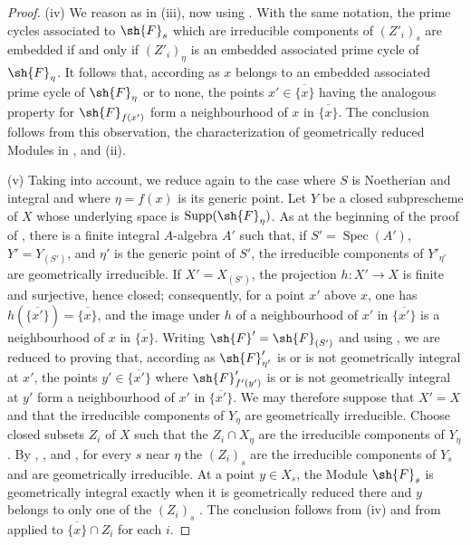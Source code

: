 \begin{proof}
(iv) We reason as in (iii), now using .
With the same notation, the prime cycles associated to $\sh{F}_s$ which are irreducible components of $(Z'_i)_s$ are embedded if and only if $(Z'_i)_\eta$ is an embedded associated prime cycle of $\sh{F}_\eta$.
It follows that, according as $x$ belongs to an embedded associated prime cycle of $\sh{F}_\eta$ or to none, the points $x'\in\overline{\{x\}}$ having the analogous property for $\sh{F}_{f(x')}$ form a neighbourhood of $x$ in $\overline{\{x\}}$.
The conclusion follows from this observation, the characterization of geometrically reduced Modules in , and (ii).

(v) Taking  into account, we reduce again to the case where $S$ is Noetherian and integral and where $\eta=f(x)$ is its generic point.
Let $Y$ be a closed subprescheme of $X$ whose underlying space is $\operatorname{Supp}(\sh{F}_\eta)$.
As at the beginning of the proof of , there is a finite integral $A$-algebra $A'$ such that, if $S'=\operatorname{Spec}(A')$, $Y'=Y_{(S')}$, and $\eta'$ is the generic point of $S'$, the irreducible components of $Y'_{\eta'}$ are geometrically irreducible.
If $X'=X_{(S')}$, the projection $h:X'\to X$ is finite and surjective, hence closed; consequently, for a point $x'$ above $x$, one has $h(\overline{\{x'\}})=\overline{\{x\}}$, and the image under $h$ of a neighbourhood of $x'$ in $\overline{\{x'\}}$ is a neighbourhood of $x$ in $\overline{\{x\}}$.
Writing $\sh{F}'=\sh{F}_{(S')}$ and using , we are reduced to proving that, according as $\sh{F}'_{\eta'}$ is or is not geometrically integral at $x'$, the points $y'\in\overline{\{x'\}}$ where $\sh{F}'_{f'(y')}$ is or is not geometrically integral at $y'$ form a neighbourhood of $x'$ in $\overline{\{x'\}}$.
We may therefore suppose that $X'=X$ and that the irreducible components of $Y_\eta$ are geometrically irreducible.
Choose closed subsets $Z_i$ of $X$ such that the $Z_i\cap X_\eta$ are the
irreducible components of $Y_\eta$.
By , , and , for every $s$ near $\eta$ the $(Z_i)_s$ are the irreducible components of $Y_s$ and are geometrically irreducible.
At a point $y\in X_s$, the Module $\sh{F}_s$ is geometrically integral exactly when it is geometrically reduced there and $y$ belongs to only one of the $(Z_i)_s$ .
The conclusion follows from (iv) and from  applied to $\overline{\{x\}}\cap Z_i$ for each $i$.


\end{proof}
